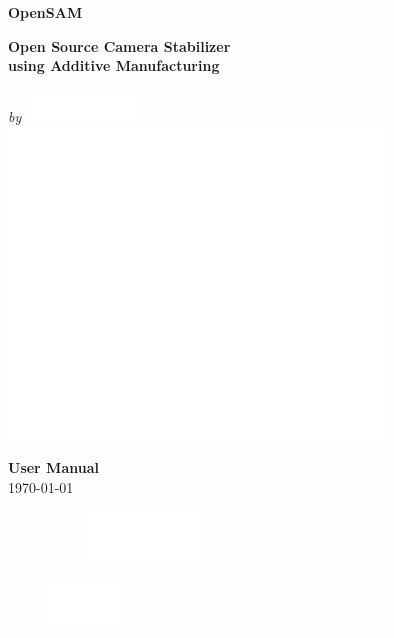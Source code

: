 \begin{titlepage}
\pagecolor{titlepagecolor}
\par
\noindent
\color{white}
\textbf{\textsf{\fontsize{72}{60}\selectfont OpenSAM }}\\[2em]
\par
\noindent
\textbf{\textsf{\fontsize{16}{16}\selectfont Open Source Camera Stabilizer\\using Additive Manufacturing \\}}
\makebox[0pt][l]{\rule{1.3\textwidth}{1pt}}\\[1em]
\textcolor{namecolor}{\textit{\textsf{\fontsize{21}{21}\selectfont by }}} \includegraphics[width=3cm]{OHM.eps} \\[3em]
\includegraphics[width=10cm]{wireframe_frontpage.eps}\\[1cm]
\par
\noindent
\textbf{\textsf{\fontsize{21}{12}\selectfont User Manual}}
\textcolor{namecolor}{\textsf{\fontsize{21}{21}}}\\[1em]
\textcolor{namecolor}{\textsf{\fontsize{12}{21}\selectfont \monthyeardate\today}}
\\[0cm]
\par
\noindent

\begin{figure}[!h]
    \raggedright
    \begin{subfigure}
        \raggedleft
        \includegraphics[width=3cm]{DTUlogo.eps}
    \end{subfigure}%
    \quad\quad\quad
    \begin{subfigure}
        \raggedright
        \includegraphics[width=2cm]{OHM_FULL_White.png}
    \end{subfigure}
\end{figure}

\end{titlepage}
\restoregeometry %
\nopagecolor%

\newpage